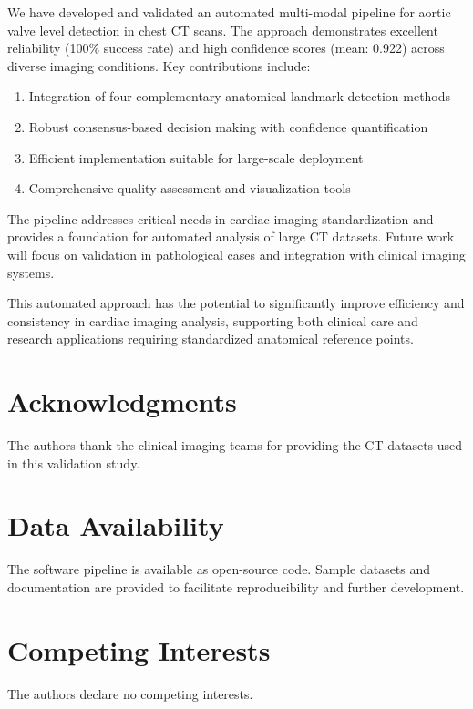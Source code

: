 \documentclass[11pt,a4paper]{article}
\begin{document}
We have developed and validated an automated multi-modal pipeline for aortic valve level detection in chest CT scans. The approach demonstrates excellent reliability (100\% success rate) and high confidence scores (mean: 0.922) across diverse imaging conditions. Key contributions include:

\begin{enumerate}
\item Integration of four complementary anatomical landmark detection methods
\item Robust consensus-based decision making with confidence quantification
\item Efficient implementation suitable for large-scale deployment
\item Comprehensive quality assessment and visualization tools
\end{enumerate}

The pipeline addresses critical needs in cardiac imaging standardization and provides a foundation for automated analysis of large CT datasets. Future work will focus on validation in pathological cases and integration with clinical imaging systems.

This automated approach has the potential to significantly improve efficiency and consistency in cardiac imaging analysis, supporting both clinical care and research applications requiring standardized anatomical reference points.

\section*{Acknowledgments}

The authors thank the clinical imaging teams for providing the CT datasets used in this validation study.

\section*{Data Availability}

The software pipeline is available as open-source code. Sample datasets and documentation are provided to facilitate reproducibility and further development.

\section*{Competing Interests}

The authors declare no competing interests.
\end{document}
